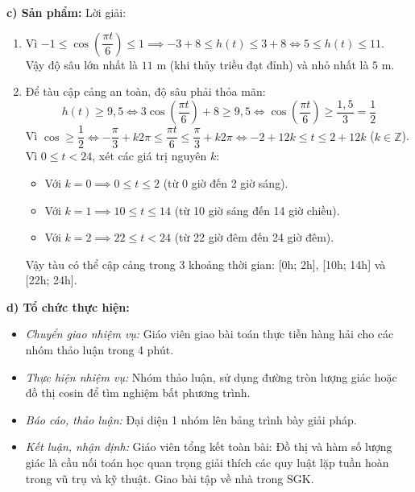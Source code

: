 \documentclass[12pt, a4paper]{article}
\begin{document}
\textbf{c) Sản phẩm:} Lời giải:
\begin{enumerate}[leftmargin=0.5cm]
    \item Vì $-1 \le \cos\left(\dfrac{\pi t}{6}\right) \le 1 \implies -3 + 8 \le h(t) \le 3 + 8 \iff 5 \le h(t) \le 11$.\\
    Vậy độ sâu lớn nhất là $11\text{ m}$ (khi thủy triều đạt đỉnh) và nhỏ nhất là $5\text{ m}$.
    \item Để tàu cập cảng an toàn, độ sâu phải thỏa mãn:
    $$h(t) \ge 9{,}5 \iff 3\cos\left(\dfrac{\pi t}{6}\right) + 8 \ge 9{,}5 \iff \cos\left(\dfrac{\pi t}{6}\right) \ge \dfrac{1{,}5}{3} = \dfrac{1}{2}$$
    Vì $\cos \ge \dfrac{1}{2} \iff -\dfrac{\pi}{3} + k2\pi \le \dfrac{\pi t}{6} \le \dfrac{\pi}{3} + k2\pi \iff -2 + 12k \le t \le 2 + 12k$ ($k \in \mathbb{Z}$).\\
    Vì $0 \le t < 24$, xét các giá trị nguyên $k$:
    \begin{itemize}[leftmargin=0.5cm]
        \item Với $k = 0 \implies 0 \le t \le 2$ (từ 0 giờ đến 2 giờ sáng).
        \item Với $k = 1 \implies 10 \le t \le 14$ (từ 10 giờ sáng đến 14 giờ chiều).
        \item Với $k = 2 \implies 22 \le t < 24$ (từ 22 giờ đêm đến 24 giờ đêm).
    \end{itemize}
    Vậy tàu có thể cập cảng trong 3 khoảng thời gian: [0h; 2h], [10h; 14h] và [22h; 24h].
\end{enumerate}

\textbf{d) Tổ chức thực hiện:}
\begin{itemize}[leftmargin=0.6cm]
    \item \textit{Chuyển giao nhiệm vụ:} Giáo viên giao bài toán thực tiễn hàng hải cho các nhóm thảo luận trong 4 phút.
    \item \textit{Thực hiện nhiệm vụ:} Nhóm thảo luận, sử dụng đường tròn lượng giác hoặc đồ thị cosin để tìm nghiệm bất phương trình.
    \item \textit{Báo cáo, thảo luận:} Đại diện 1 nhóm lên bảng trình bày giải pháp.
    \item \textit{Kết luận, nhận định:} Giáo viên tổng kết toàn bài: Đồ thị và hàm số lượng giác là cầu nối toán học quan trọng giải thích các quy luật lặp tuần hoàn trong vũ trụ và kỹ thuật. Giao bài tập về nhà trong SGK.
\end{itemize}

\newpage
\end{document}
